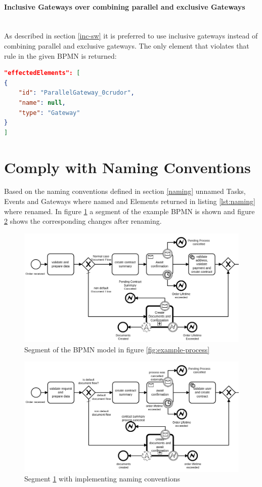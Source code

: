\paragraph{Inclusive Gateways over combining parallel and exclusive Gateways}~\\
As described in section \ref{inc-sw} it is preferred to use inclusive gateways instead of combining parallel and exclusive gateways. The only element that violates that rule in the given BPMN is returned:
\begin{lstlisting}[language=json]
"effectedElements": [
{
	"id": "ParallelGateway_0crudor",
	"name": null,
	"type": "Gateway"
}
]
\end{lstlisting}
\section{Comply with Naming Conventions}
Based on the naming conventions defined in section \ref{naming} unnamed Tasks, Events and Gateways where named and Elements returned in listing \ref{lst:naming} where renamed. In figure \ref{fig:naming-org} a segment of the example BPMN is shown and figure \ref{fig:naming-new} shows the corresponding changes after renaming. 

\begin{figure}[H]
	\centering
	\includegraphics[width=0.9\columnwidth]{graphics/case-study-naming-org}
	\caption{Segment of the BPMN model in figure \ref{fig:example-process}}
	\label{fig:naming-org}
\end{figure}

\begin{figure}[H]
	\centering
	\includegraphics[width=0.9\columnwidth]{graphics/case-study-naming-new}
	\caption{Segment \ref{fig:naming-org} with implementing naming conventions}
	\label{fig:naming-new}
\end{figure}

